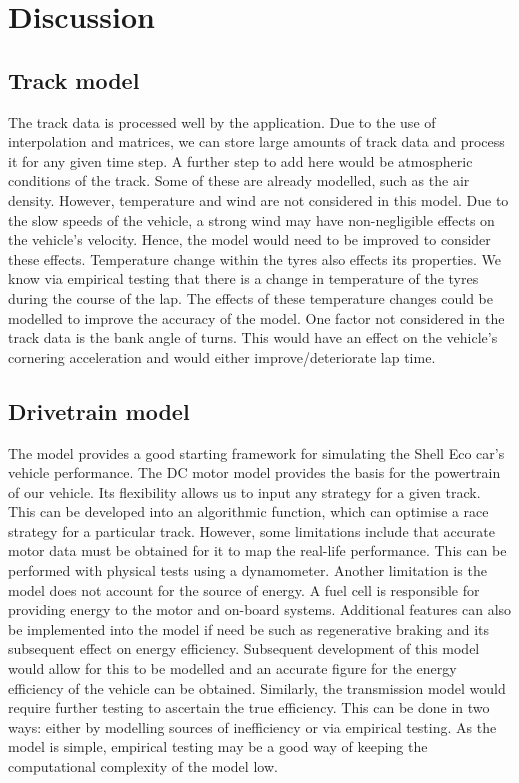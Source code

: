 \documentclass[11pt]{article}
\numberwithin{equation}{section}
\begin{document}
\section{Discussion}
\subsection{Track model}
The track data is processed well by the application. Due to the use of interpolation and matrices, we can store large amounts of track data and process it for any given time step. A further step to add here would be atmospheric conditions of the track. Some of these are already modelled, such as the air density. However, temperature and wind are not considered in this model. Due to the slow speeds of the vehicle, a strong wind may have non-negligible effects on the vehicle's velocity. Hence, the model would need to be improved to consider these effects. Temperature change within the tyres also effects its properties. We know via empirical testing that there is a change in temperature of the tyres during the course of the lap. The effects of these temperature changes could be modelled to improve the accuracy of the model. One factor not considered in the track data is the bank angle of turns. This would have an effect on the vehicle's cornering acceleration and would either improve/deteriorate lap time.

\subsection{Drivetrain model}
The model provides a good starting framework for simulating the Shell Eco car's vehicle performance. The DC motor model provides the basis for the powertrain of our vehicle. Its flexibility allows us to input any strategy for a given track. This can be developed into an algorithmic function, which can optimise a race strategy for a particular track. However, some limitations include that accurate motor data must be obtained for it to map the real-life performance. This can be performed with physical tests using a dynamometer. Another limitation is the model does not account for the source of energy. A fuel cell is responsible for providing energy to the motor and on-board systems. Additional features can also be implemented into the model if need be such as regenerative braking and its subsequent effect on energy efficiency. Subsequent development of this model would allow for this to be modelled and an accurate figure for the energy efficiency of the vehicle can be obtained. Similarly, the transmission model would require further testing to ascertain the true efficiency. This can be done in two ways: either by modelling sources of inefficiency or via empirical testing. As the model is simple, empirical testing may be a good way of keeping the computational complexity of the model low.  
\end{document}
